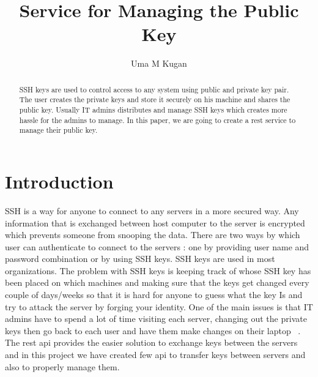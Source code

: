 
\title{Service for Managing the Public Key}

\author{Uma M Kugan}

\renewcommand{\shortauthors}{Uma Kugan}
\begin{abstract}
SSH keys are used to control access to any system using public and private
key pair. The user creates the private keys and store it securely on his 
machine and shares the public key. Usually IT admins distributes and
manage SSH keys which creates more hassle for the admins to manage.
In this paper, we are going to create a rest service to manage their
public key.

\end{abstract}



\maketitle

\section{Introduction}
SSH is a way for anyone to connect to any servers in a more secured way. 
Any information that is exchanged between host computer to the server is
encrypted which prevents someone from snooping the data. There are two
ways by which user can authenticate to connect to the servers : one by
providing user name and password combination or by using SSH keys.
SSH keys are used in most organizations. The problem with SSH keys is keeping 
track of whose SSH key has been placed on which machines and making sure that 
the keys get changed every couple of days/weeks so that it is hard for anyone 
to guess what the key Is and try to attack the server by forging your 
identity. One of the main issues is that IT admins have to spend a lot of 
time visiting each server, changing out the private keys then go back to each
user and have them make changes on their laptop
~\cite{hid-sp18-513-ylonen2013user}. 
The rest api provides the easier solution to exchange keys between the servers
and in this project we have created few api to transfer keys between servers
and also to properly manage them.

